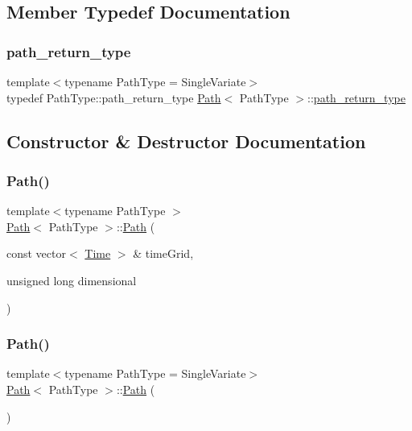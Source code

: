 \subsection{Member Typedef Documentation}
\hypertarget{class_path_a3b1c34a87f7867f6fed2e0a33f801e7d}{}\label{class_path_a3b1c34a87f7867f6fed2e0a33f801e7d} 
\subsubsection{\texorpdfstring{path\+\_\+return\+\_\+type}{path\_return\_type}}
{\footnotesize\ttfamily template$<$typename Path\+Type = Single\+Variate$>$ \\
typedef Path\+Type\+::path\+\_\+return\+\_\+type \hyperlink{class_path}{Path}$<$ Path\+Type $>$\+::\hyperlink{class_path_a3b1c34a87f7867f6fed2e0a33f801e7d}{path\+\_\+return\+\_\+type}}



\subsection{Constructor \& Destructor Documentation}
\hypertarget{class_path_af716cfa221637551e0b0a5b78be82d5c}{}\label{class_path_af716cfa221637551e0b0a5b78be82d5c} 
\subsubsection{\texorpdfstring{Path()}{Path()}\hspace{0.1cm}{\footnotesize\ttfamily [1/2]}}
{\footnotesize\ttfamily template$<$typename Path\+Type $>$ \\
\hyperlink{class_path}{Path}$<$ Path\+Type $>$\+::\hyperlink{class_path}{Path} (\begin{DoxyParamCaption}\item[{const vector$<$ \hyperlink{_name_def_8h_ac2d3e0ba793497bcca555c7c2cf64ff3}{Time} $>$ \&}]{time\+Grid,  }\item[{unsigned long}]{dimensional }\end{DoxyParamCaption})}

\hypertarget{class_path_a8437fecb95fe145057c957feb8b8955a}{}\label{class_path_a8437fecb95fe145057c957feb8b8955a} 
\subsubsection{\texorpdfstring{Path()}{Path()}\hspace{0.1cm}{\footnotesize\ttfamily [2/2]}}
{\footnotesize\ttfamily template$<$typename Path\+Type = Single\+Variate$>$ \\
\hyperlink{class_path}{Path}$<$ Path\+Type $>$\+::\hyperlink{class_path}{Path} (\begin{DoxyParamCaption}{ }\end{DoxyParamCaption})\hspace{0.3cm}{\ttfamily [default]}}

